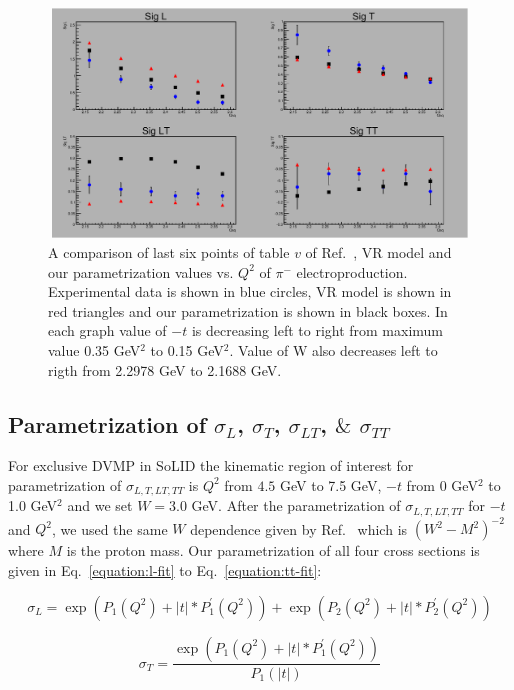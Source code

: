 \begin{figure}[!hbt]
    \centering
    \includegraphics[width=6.0in,height=2.4in]{./figures/pimsigma_qsq.pdf}
    \caption{ A comparison of last six points of table $v$ of Ref.~\cite{gmhuber-2}, VR model and our parametrization values vs. $Q^{2}$ 
    of $\pi^{-}$ electroproduction. Experimental data is shown in blue circles, VR model is shown in red triangles and our 
    parametrization is shown in black boxes. In each graph value of $-t$ is decreasing left to right from maximum value 0.35 GeV$^2$ 
    to 0.15 GeV$^2$. Value of W also decreases left to rigth from 2.2978 GeV to 2.1688 GeV.}
    \label{fig:expvrfit}
\end{figure}

\subsection{Parametrization of $\sigma_{L}$, $\sigma_{T}$, $\sigma_{LT}$, $\&$ $\sigma_{TT}$}
For exclusive DVMP in SoLID the kinematic region of interest for parametrization of $\sigma_{L,T,LT,TT}$ is $Q^2$ 
from $4.5$ GeV to 7.5 GeV, $-t$ from 0 GeV$^2$ to 1.0 GeV$^2$ and we set $W = 3.0$ GeV. After the parametrization of 
$\sigma_{L,T,LT,TT}$ for $-t$ and $Q^2$, we used the same $W$ dependence given by Ref.~\cite{gmhuber} which is $(W^2-M^2)^{-2}$ where
$M$ is the proton mass. Our parametrization of all four cross sections is given in Eq.~\ref{equation:l-fit} to 
Eq.~\ref{equation:tt-fit}:

\begin{equation}
        \sigma_{L} = \exp{(P_1(Q^2) + |t| * P^{\prime}_1(Q^2))} + \exp{(P_2(Q^2) + |t| * P^{\prime}_2(Q^2))}
     \label{equation:l-fit}
\end{equation}

\begin{equation}
        \sigma_{T} =  \frac{\exp{(P_1(Q^2) + |t| * P^{\prime}_1(Q^2))}}{P_{1}(|t|)}
     \label{equation:t-fit}
\end{equation}

